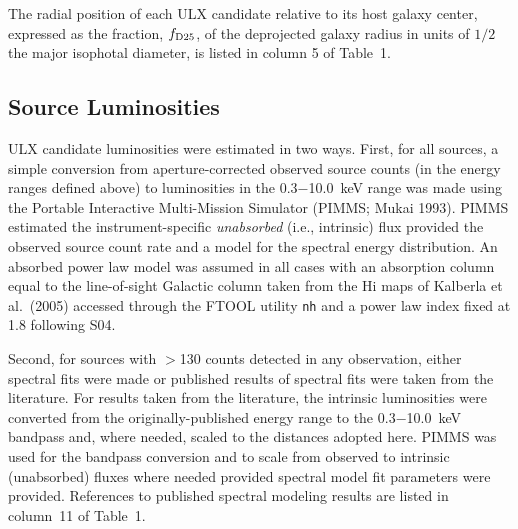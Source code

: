 \documentclass{article}
\newcommand{\etal}{et al.}
\begin{document}
The radial position of each ULX candidate relative to its host galaxy center,
 expressed as the fraction, $f_{\rm D25}$, of the deprojected galaxy radius in 
 units of $1/2$ the major isophotal diameter, is listed in 
 column 5 of Table~1.

\subsection{Source Luminosities}

ULX candidate luminosities were estimated in two ways.
First, for all sources, a simple conversion from aperture-corrected 
 observed source counts (in the energy ranges defined above)
 to luminosities in the 0.3$-$10.0~keV range was made using the 
 Portable Interactive Multi-Mission Simulator (PIMMS; Mukai 1993).
PIMMS estimated the instrument-specific {\sl unabsorbed} (i.e., intrinsic)
 flux provided the observed source
 count rate and a model for the spectral energy distribution.
An absorbed power law model was assumed in all cases with an absorption 
 column equal to the line-of-sight Galactic column taken from the
H{\sc i} maps of Kalberla \etal\ (2005)
 accessed through the FTOOL utility {\tt nh}
 and a power law index fixed at 1.8 following S04.

Second, for sources with $>$130 counts detected in any observation,
 either spectral fits were made or published results of spectral 
 fits were taken from the literature.
For results taken from the literature, 
 the intrinsic luminosities were converted from the 
 originally-published energy range to the 0.3$-$10.0~keV bandpass
 and, where needed, scaled to the distances adopted here.
PIMMS was used for the bandpass conversion and to scale 
 from observed to intrinsic (unabsorbed) fluxes where needed provided
 spectral model fit parameters were provided.
References to published spectral modeling results 
 are listed in column~11 of Table~1.
\end{document}
